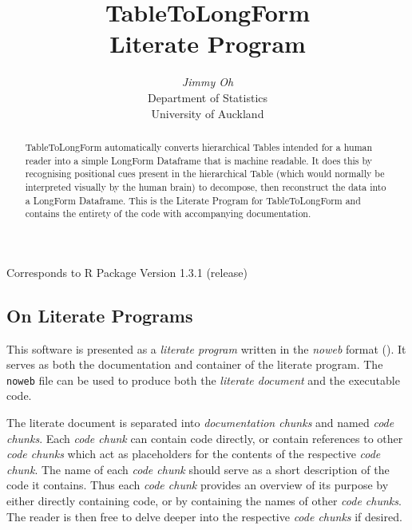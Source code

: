\documentclass[a4paper]{article}
\begin{document}
\renewcommand\abstractname{\large Abstract}
\title{\textbf{TableToLongForm}\\
  Literate Program}
\author{\textit{Jimmy Oh}\\
  [12pt] Department of Statistics\\
  University of Auckland}
\date{}
\maketitle
\codemargin=24pt
\begin{center}
Corresponds to R Package Version 1.3.1 (release)
\end{center}
\begin{abstract}\normalsize
  TableToLongForm automatically converts hierarchical Tables intended
  for a human reader into a simple LongForm Dataframe that is machine
  readable. It does this by recognising positional cues present in the
  hierarchical Table (which would normally be interpreted visually by
  the human brain) to decompose, then reconstruct the data into a
  LongForm Dataframe. This is the Literate Program for TableToLongForm
  and contains the entirety of the code with accompanying
  documentation.
\end{abstract}
\tableofcontents

\subsection*{On Literate Programs}
\label{sec:literate.program}
This software is presented as a \emph{literate program} written in the
\emph{noweb} format (\citealt{noweb}). It serves as both the
documentation and container of the literate program. The \verb|noweb|
file can be used to produce both the \emph{literate document} and the
executable code.

The literate document is separated into \emph{documentation chunks}
and named \emph{code chunks}. Each \emph{code chunk} can contain code
directly, or contain references to other \emph{code chunks} which act
as placeholders for the contents of the respective \emph{code
  chunk}. The name of each \emph{code chunk} should serve as a short
description of the code it contains. Thus each \emph{code chunk}
provides an overview of its purpose by either directly containing
code, or by containing the names of other \emph{code chunks}. The
reader is then free to delve deeper into the respective \emph{code
  chunks} if desired.
\end{document}

